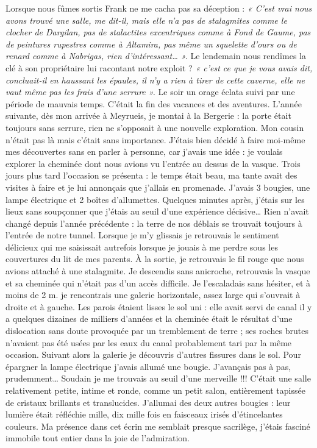 Lorsque nous fûmes sortis Frank ne me cacha pas sa déception : \textit{« C’est vrai nous avons
trouvé une salle, me dit-il, mais elle n’a pas de stalagmites comme le clocher de Dargilan,
pas de stalactites excentriques comme à Fond de Gaume, pas de peintures rupestres comme à
Altamira, pas même un squelette d’ours ou de renard comme à Nabrigas, rien
d’intéressant… ».}
Le lendemain nous rendîmes la clé à son propriétaire lui racontant notre exploit ? \textit{« c’est ce
que je vous avais dit, concluait-il en haussant les épaules, il n’y a rien à tirer de cette
caverne, elle ne vaut même pas les frais d’une serrure ».}
Le soir un orage éclata suivi par une période de mauvais temps. C’était la fin des vacances et
des aventures.
L’année suivante, dès mon arrivée à Meyrueis, je montai à la Bergerie : la porte était toujours
sans serrure, rien ne s’opposait à une nouvelle exploration. Mon cousin n’était pas là mais
c’était sans importance. J’étais bien décidé à faire moi-même mes découvertes sans en parler à
personne, car j’avais une idée : je voulais explorer la cheminée dont nous avions vu l’entrée
au dessus de la vasque. Trois jours plus tard l’occasion se présenta : le temps était beau, ma
tante avait des visites à faire et je lui annonçais que j’allais en promenade. J’avais 3 bougies,
une lampe électrique et 2 boîtes d’allumettes. Quelques minutes après, j’étais sur les lieux
sans soupçonner que j’étais au seuil d’une expérience décisive…
Rien n’avait changé depuis l’année précédente : la terre de nos déblais se trouvait toujours à
l’entrée de notre tunnel. Lorsque je m’y glissais je retrouvais le sentiment délicieux qui me
saisissait autrefois lorsque je jouais à me perdre sous les couvertures du lit de mes parents. À
la sortie, je retrouvais le fil rouge que nous avions attaché à une stalagmite. Je descendis sans
anicroche, retrouvais la vasque et sa cheminée qui n’était pas d’un accès difficile. Je
l’escaladais sans hésiter, et à moins de 2 m. je rencontrais une galerie horizontale, assez large
qui s’ouvrait à droite et à gauche. Les parois étaient lisses le sol uni : elle avait servi de canal
il y a quelques dizaines de milliers d’années et la cheminée était le résultat d’une dislocation
sans doute provoquée par un tremblement de terre ; ses roches brutes n’avaient pas été usées
par les eaux du canal probablement tari par la même occasion. Suivant alors la galerie je
découvris d’autres fissures dans le sol. Pour épargner la lampe électrique j’avais allumé une
bougie. J’avançais pas à pas, prudemment… Soudain je me trouvais au seuil d’une
merveille !!! C’était une salle relativement petite, intime et ronde, comme un petit salon,
entièrement tapissée de cristaux brillants et translucides. J’allumai des deux autres bougies :
leur lumière était réfléchie mille, dix mille fois en faisceaux irisés d’étincelantes couleurs. Ma
présence dans cet écrin me semblait presque sacrilège, j’étais fasciné immobile tout entier
dans la joie de l’admiration.

